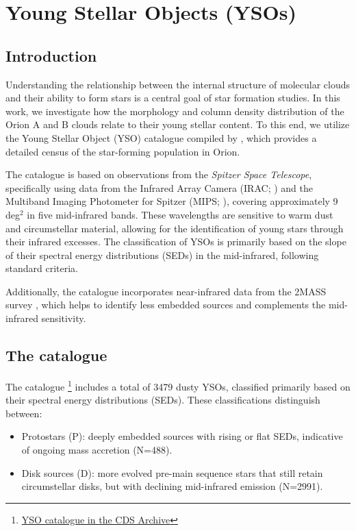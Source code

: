 \section{Young Stellar Objects (YSOs)}

\subsection{Introduction}

Understanding the relationship between the internal structure of molecular clouds and their ability to form stars is a central goal of star formation studies. In this work, we investigate how the morphology and column density distribution of the Orion A and B clouds relate to their young stellar content. To this end, we utilize the Young Stellar Object (YSO) catalogue compiled by \cite{megeath2012catalogue}, which provides a detailed census of the star-forming population in Orion.

The catalogue is based on observations from the \textit{Spitzer Space Telescope}, specifically using data from the Infrared Array Camera (IRAC; \cite{fazio2004IRAC}) and the Multiband Imaging Photometer for Spitzer (MIPS; \cite{rieke2004MIPS}), covering approximately 9 deg$^2$ in five mid-infrared bands. These wavelengths are sensitive to warm dust and circumstellar material, allowing for the identification of young stars through their infrared excesses. The classification of YSOs is primarily based on the slope of their spectral energy distributions (SEDs) in the mid-infrared, following standard criteria.

Additionally, the catalogue incorporates near-infrared data from the 2MASS survey \cite{skrutskie2006two}, which helps to identify less embedded sources and complements the mid-infrared sensitivity.

\subsection{The catalogue}
The catalogue \footnote{\href{http://cdsarc.cds.unistra.fr}{YSO catalogue in the CDS Archive}} includes a total of 3479 dusty YSOs, classified primarily based on their spectral energy distributions (SEDs). These classifications distinguish between:
\begin{itemize}
    \item Protostars (P): deeply embedded sources with rising or flat SEDs, indicative of ongoing mass accretion (N=488).
    \item Disk sources (D): more evolved pre-main sequence stars that still retain circumstellar disks, but with declining mid-infrared emission (N=2991).
\end{itemize}

